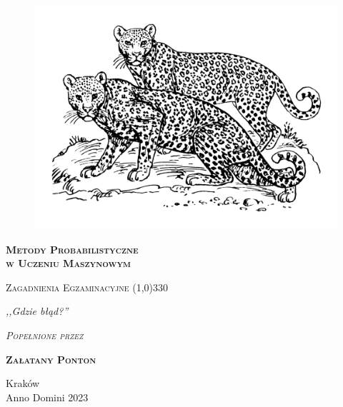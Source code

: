 \begin{titlepage}
	\begin{center}
		\begin{figure}[h]
			\centering
			\includegraphics[]{img/pumy.png}

		\end{figure}

		\Huge
		\textbf{\textsc{Metody Probabilistyczne \\ w Uczeniu Maszynowym}}

		\vspace{0.5cm}
		\Large
		\textsc{Zagadnienia Egzaminacyjne}
		\line(1,0){330}

		\normalsize

		\vspace{1cm}
		\textit{,,Gdzie błąd?''}
		\vspace{1cm}

		\textit{\textsc{Popełnione przez}}\\
		\vspace{5mm}

		\textbf{\textsc{Załatany Ponton}}

		\vfill

		Kraków \\
		Anno Domini 2023
	\end{center}
\end{titlepage}